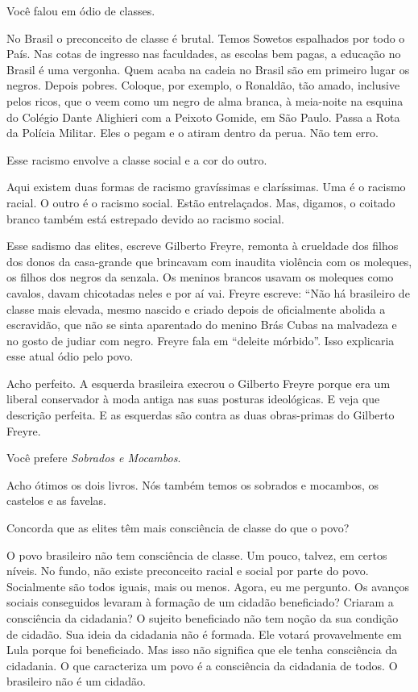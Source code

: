 \falaG Você falou em ódio de classes.

\falaM No Brasil o preconceito de classe é brutal. Temos Sowetos espalhados
por todo o País. Nas cotas de ingresso nas faculdades, as escolas bem
pagas, a educação no Brasil é uma vergonha. Quem acaba na cadeia no
Brasil são em primeiro lugar os negros. Depois pobres. Coloque, por
exemplo, o Ronaldão, tão amado, inclusive pelos ricos, que o veem como
um negro de alma branca, à meia-noite na esquina do Colégio Dante
Alighieri com a Peixoto Gomide, em São Paulo. Passa a Rota da Polícia
Militar. Eles o pegam e o atiram dentro da perua. Não tem erro.

\falaG Esse racismo envolve a classe social e a cor do outro.

\falaM Aqui existem duas formas de racismo gravíssimas e claríssimas. Uma é
o racismo racial. O outro é o racismo social. Estão entrelaçados. Mas,
digamos, o coitado branco também está estrepado devido ao racismo
social.

\falaG Esse sadismo das elites, escreve Gilberto Freyre, remonta à crueldade
dos filhos dos donos da casa-grande que brincavam com inaudita violência
com os moleques, os filhos dos negros da senzala. Os meninos brancos
usavam os moleques como cavalos, davam chicotadas neles e por aí vai.
Freyre escreve: ``Não há brasileiro de classe mais elevada, mesmo
nascido e criado depois de oficialmente abolida a escravidão, que não se
sinta aparentado do menino Brás Cubas na malvadeza e no gosto de judiar
com negro. Freyre fala em ``deleite mórbido''. Isso explicaria esse
atual ódio pelo povo.

\falaM Acho perfeito. A esquerda brasileira execrou o Gilberto Freyre porque
era um liberal conservador à moda antiga nas suas posturas ideológicas.
E veja que descrição perfeita. E as esquerdas são contra as duas
obras-primas do Gilberto Freyre.

\falaG Você prefere \emph{Sobrados e Mocambos}.

\falaM Acho ótimos os dois livros. Nós também temos os sobrados e mocambos,
os castelos e as favelas.

\falaG Concorda que as elites têm mais consciência de classe do que o povo?

\falaM O povo brasileiro não tem consciência de classe. Um pouco, talvez, em
certos níveis. No fundo, não existe preconceito racial e social por
parte do povo. Socialmente são todos iguais, mais ou menos. Agora, eu me
pergunto. Os avanços sociais conseguidos levaram à formação de um
cidadão beneficiado? Criaram a consciência da cidadania? O sujeito
beneficiado não tem noção da sua condição de cidadão. Sua ideia da
cidadania não é formada. Ele votará provavelmente em Lula porque foi
beneficiado. Mas isso não significa que ele tenha consciência da
cidadania. O que caracteriza um povo é a consciência da cidadania de
todos. O brasileiro não é um cidadão.

